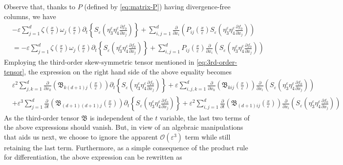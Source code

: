 \documentclass[preprint, 12pt]{amsart}
\numberwithin{equation}{section}
\numberwithin{equation}{section}
\newcommand{\xeps}{\left(\frac{x}{\varepsilon}\right)}
\newcommand{\eps}{\varepsilon}
\begin{document}
Observe that, thanks to $P$ (defined by \eqref{eq:matrix-P}) having divergence-free columns, we have
\begin{equation*}
\begin{aligned}
& -\eps \sum_{j=1}^d \zeta\xeps\omega_j\xeps\partial_t \left\{S_\eps \left( \eta_3^\eps \eta_4^\eps \frac{\partial f_0}{\partial x_j} \right)\right\}
+ \sum_{i,j=1}^d \frac{\partial}{\partial x_i} \left(P_{ij}\xeps S_\eps \left( \eta_3^\eps \eta_4^\eps \frac{\partial f_0}{\partial x_j} \right) \right)
\\
& = - \eps \sum_{j=1}^d \zeta\xeps\omega_j\xeps\partial_t \left\{S_\eps \left( \eta_3^\eps \eta_4^\eps \frac{\partial f_0}{\partial x_j} \right)\right\}
+ \sum_{i,j=1}^d P_{ij}\xeps \frac{\partial}{\partial x_i} \left( S_\eps \left( \eta_3^\eps \eta_4^\eps \frac{\partial f_0}{\partial x_j} \right) \right)
\end{aligned}
\end{equation*}
Employing the third-order skew-symmetric tensor mentioned in \eqref{eq:3rd-order-tensor}, the expression on the right hand side of the above equality becomes
\begin{equation*}
\begin{aligned}
& \eps^2 \sum_{j,k=1}^d \frac{\partial}{\partial x_k} \left( \mathfrak{B}_{k(d+1)j}\xeps\right) \partial_t \left\{S_\eps \left( \eta_3^\eps \eta_4^\eps \frac{\partial f_0}{\partial x_j} \right)\right\}
+ \eps \sum_{i,j,k=1}^d \frac{\partial}{\partial x_k} \left( \mathfrak{B}_{kij}\xeps\right) \frac{\partial}{\partial x_i} \left( S_\eps \left( \eta_3^\eps \eta_4^\eps \frac{\partial f_0}{\partial x_j} \right) \right)
\\
& + \eps^3 \sum_{j=1}^d \frac{\partial}{\partial t} \left( \mathfrak{B}_{(d+1)(d+1)j}\xeps\right) \partial_t \left\{S_\eps \left( \eta_3^\eps \eta_4^\eps \frac{\partial f_0}{\partial x_j} \right)\right\}
+ \eps^2 \sum_{i,j=1}^d  \frac{\partial}{\partial t} \left( \mathfrak{B}_{(d+1)ij}\xeps\right) \frac{\partial}{\partial x_i} \left( S_\eps \left( \eta_3^\eps \eta_4^\eps \frac{\partial f_0}{\partial x_j} \right)\right)
\end{aligned}
\end{equation*}
As the third-order tensor $\mathfrak{B}$ is independent of the $t$ variable, the last two terms of the above expressions should vanish. But, in view of an algebraic manipulations that aids us next, we choose to ignore the apparent $\mathcal{O}(\eps^3)$ term while still retaining the last term. Furthermore, as a simple consequence of the product rule for differentiation, the above expression can be rewritten as
\end{document}

